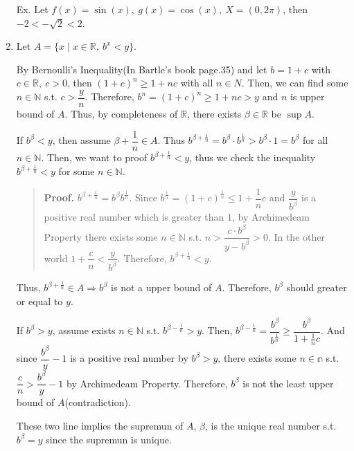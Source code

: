 \documentclass[12pt]{article}
\begin{document}
\begin{enumerate}
    Ex. Let $f(x) = \sin(x),\ g(x) = \cos(x),\ X = (0, 2\pi)$, then $-2 < -\sqrt{2} < 2$.

    \newpage

    \item Let $A = \lbrace x \mid x \in \mathbb{R},\ b^x < y\rbrace$.
    
    By Bernoulli's Inequality(In Bartle's book page.35) and let $b = 1+c$ with $c \in \mathbb{R},\ c > 0$, then $(1+c)^n \geq 1 + nc$ with all $n \in N$.
    Then, we can find some $n \in \mathbb{N}$ s.t. $c > \dfrac{y}{n}$. Therefore, $b^n = (1+c)^n \geq 1+nc > y$ and $n$ is upper bound of $A$. Thus, by completeness of $\mathbb{R}$, there exists $\beta \in \mathbb{R}$ be $\sup A$. 
    
    If $b^\beta < y$, then assume $\beta + \dfrac{1}{n} \in A$. Thus $b^{\beta + \frac{1}{n}} = b^\beta \cdot b^\frac{1}{n} > b^\beta \cdot 1 = b^\beta$ for all $n \in \mathbb{N}$.
    Then, we want to proof $b^{\beta + \frac{1}{n}} < y$, thus we check the inequality $b^{\beta + \frac{1}{n}} < y$ for some $n \in \mathbb{N}$.
    \begin{quote}
        {\bf Proof.} $b^{\beta + \frac{1}{n}} = b^\beta b^{\frac{1}{n}}$. 
        Since $b^{\frac{1}{n}} = (1+c)^\frac{1}{n} \leq 1 + \dfrac{1}{n} c$ and $\dfrac{y}{b^\beta}$ is a positive real number which is greater than $1$, 
        by Archimedeam Property there exists some $n \in \mathbb{N}$ s.t. $n > \dfrac{c\cdot b^\beta}{y-b^\beta} > 0$. In the other world $1 + \dfrac{c}{n} < \dfrac{y}{b^\beta}$.
        Therefore, $b^{\beta + \frac{1}{n}} < y$.
    \end{quote}
    
    Thus, $b^{\beta + \frac{1}{n}}\in A\Rightarrow b^\beta$ is not a upper bound of $A$.
    Therefore, $b^\beta$ should greater or equal to $y$.
    
    If $b^\beta > y$, assume exists $n \in \mathbb{N}$ s.t. $b^{\beta - \frac{1}{n}} > y$.
    Then, $b^{\beta - \frac{1}{n}} = \dfrac{b^\beta}{b^\frac{1}{n}} \geq \dfrac{b^\beta}{1 + \frac{1}{n}c}$. And since $\dfrac{b^\beta}{y}-1$ is a positive real number by $b^\beta > y$, 
    there exists some $n \in \mathbb{n}$ s.t. $\dfrac{c}{n} > \dfrac{b^\beta}{y}-1$ by Archimedeam Property. Therefore, $b^\beta$ is not the least upper bound of $A$(contradiction).

    These two line implies the supremun of $A$, $\beta$, is the unique real number s.t. $b^\beta = y$ since the supremun is unique.
\end{enumerate}
\end{document}
